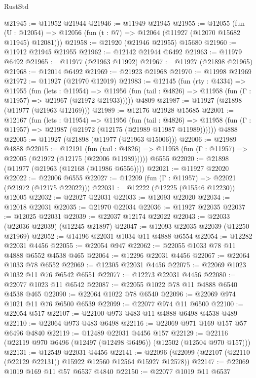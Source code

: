 \begin{lexlean}{RustStd}
\begin{coremodule}
@21945 := @11952 @21944
@21946 := @11949 @21945
@21955 := @12055
    (fun (U : @12054) => @12056 (fun (t : @7) => @12064 (@11927 (@12070 @15682 @11945) @12081)))
@21958 := @21920 (@21946 @21955) @15680
@21960 := @11912 @21945 @21955
@21962 := @12142 @21944 @6492
@21963 := @11979 @6492
@21965 := @11977 (@21963 @11992)
@21967 := @11927 (@21898 @21965)
@21968 := @12014 @6492
@21969 := @21923 @21968
@21970 := @11998 @21969
@21972 := @11927 (@21970 @12019)
@21983 := @12145
    (fun (rty : @4334) =>
    @11955
      (fun (lets : @11954) =>
      @11956 (fun (tail : @4826) => @11958 (fun (Γ : @11957) => @21967 (@21972 @21933)))))
    @4809
@21987 := @11927 (@21898 (@11977 (@21963 @12169)))
@21989 := @12176 @21928 @15685
@22001 := @12167
    (fun (lets : @11954) =>
    @11956
      (fun (tail : @4826) =>
      @11958 (fun (Γ : @11957) => @21987 (@21972 (@12175 (@21989 @11987 @11989))))))
    @4888
@22005 := @11927 (@21898 (@11977 (@21963 @15006)))
@22006 := @21989 @4888
@22015 := @12191
    (fun (tail : @4826) => @11958 (fun (Γ : @11957) => @22005 (@21972 (@12175 (@22006 @11989)))))
    @6555
@22020 := @21898 (@11977 (@21963 (@12168 (@11986 @6556))))
@22021 := @11927 @22020
@22022 := @22006 @6555
@22027 := @12209 (fun (Γ : @11957) => @22021 (@21972 (@12175 @22022)))
@22031 := @12222 (@12225 (@15546 @12230)) @12005
@22032 := @22027 @22031
@22033 := @12093 @22020
@22034 := @12018 @22031
@22035 := @21970 @22034
@22036 := @11927 @22035
@22037 := @12025 @22031
@22039 := @22037 @12174 @22022
@22043 := @22033 (@22036 @22039) (@12245 @21897)
@22047 := @12093 @22035 @22039 (@12250 @21969)
@22052 := @14196 @22031 @1034 @11 @4888 @6554
@22054 := @12282 @22031 @4456
@22055 := @22054 @947
@22062 := @22055 @1033 @78 @11 @4888 @6552 @4538 @465
@22064 := @12296 @22031 @4456
@22067 := @22064 @1033 @78 @6552
@22069 := @12305 @22031 @4456
@22075 := @22069 @1023 @1032 @11 @76 @6542 @6551
@22077 := @12273 @22031 @4456
@22080 := @22077 @1023 @11 @6542
@22087 := @22055 @1022 @78 @11 @4888 @6540 @4538 @465
@22090 := @22064 @1022 @78 @6540
@22096 := @22069 @974 @1021 @11 @76 @6500 @6539
@22099 := @22077 @974 @11 @6500
@22100 := @22054 @517
@22107 := @22100 @973 @483 @11 @4888 @6498 @4538 @489
@22110 := @22064 @973 @483 @6498
@22116 := @22069 @971 @169 @157 @57 @6496 @4840
@22119 := @12489 @22031 @4456 @157
@22129 := @22116 (@22119 @970 @6496 (@12497 (@12498 @6496)) (@12502 (@12504 @970 @157)))
@22131 := @12549 @22031 @4456
@22141 := @22096 (@22099 (@22107 (@22110 (@22129 @22131)) @15922 @12560 @12564 @15927 @12578))
@22147 := @22069 @1019 @169 @11 @57 @6537 @4840
@22150 := @22077 @1019 @11 @6537

\end{coremodule}
\end{lexlean}
